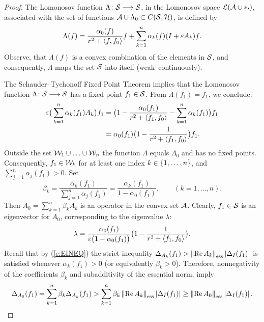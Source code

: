 \begin{proof}
\smallskip

The Lomonosov function $\Lambda\colon{\cal S}\longrightarrow{\cal S}$, in the Lomonosov
space $\cal{L}({{\cal A}\cup\Lambda_0})$, associated with the set of
functions ${\cal A}\cup\Lambda_0\subset{}C({\cal S},{\cal H})$, is defined by
\[ \Lambda(f) = \frac{\alpha_0(f)}{r^2+\left<f,f_0\right>} f +
   \sum_{k=1}^n \alpha_k(f) (I+\varepsilon A_k)f. \]
Observe, that $\Lambda(f)$ is a convex combination of the
elements in ${\cal S}$, and consequently, $\Lambda$ maps the set ${\cal S}$
into itself (weak--continuously).

\def\baselinestretch{1.66}
\goodbreak

The Schauder--Tychonoff Fixed Point Theorem implies that the
Lomonosov function $\Lambda\colon{\cal S}\longrightarrow{\cal S}$ has a fixed point
$f_1\in{\cal S}$. From $\Lambda(f_1)=f_1$, we conclude:
\begin{equation*}
\begin{split}
   \varepsilon \big(\sum_{k=1}^n \alpha_k(f_1) A_k\big)f_1 & =
   \big(1-\frac{\alpha_0(f_1)}{r^2+\left<f_1,f_0\right>} -
   \sum_{k=1}^n \alpha_k(f_1)\big)f_1 \\
 & = \alpha_0(f_1)\big(1 -  \frac{1}{r^2+\left<f_1,f_0\right>}\big)f_1.
\end{split}
\end{equation*}
Outside the set ${\cal W}_1\cup\ldots\cup{\cal W}_n$ the function $\Lambda$
equals $\Lambda_0$ and has no fixed points. Consequently,
$f_1\in{\cal W}_k$ for at least one index $k\in\left\{1,\ldots,n\right\}$, and
$\sum_{j=1}^n\alpha_j(f_1)>0$. Set
\[ \beta_k=\frac{\alpha_k(f_1)}{\sum_{j=1}^n \alpha_j(f_1)}=
           \frac{\alpha_k(f_1)}{1-\alpha_0(f_1)},
           \qquad (k=1,\ldots,n). \]
Then $A_0=\sum_{k=1}^n \beta_k A_k$ is an operator in the
convex set ${\cal A}$. Clearly, $f_1\in{\cal S}$ is an eigenvector for
$A_0$, corresponding to the eigenvalue $\lambda$:
\begin{equation}\label{e:LAMBDA}
   \lambda = \frac{\alpha_0(f_1)}{\varepsilon\big(1-\alpha_0(f_1)\big)}\big(1 -
  \frac{1}{r^2+\left<f_1,f_0\right>}\big).
\end{equation}
Recall that by (\ref{e:EINEQ}) the strict inequality
$\Delta_{A_k}(f_1) > \essnorm{\RE{}A_k}\abs{\Delta_I(f_1)}$ is
satisfied whenever $\alpha_k(f_1)>0$ (or equivalently
$\beta_k>0$). Therefore, nonnegativity of the coefficients
$\beta_k$ and subadditivity of the essential norm, imply
\begin{equation*}
   \Delta_{A_0}(f_1) =
   \sum_{k=1}^n \beta_k \Delta_{A_k}(f_1)
   > \sum_{k=1}^n \beta_k \essnorm{\RE{}A_k}\abs{\Delta_I(f_1)}
   \geq \essnorm{\RE{}A_0}\abs{\Delta_I(f_1)}.
\end{equation*}

\end{proof}
